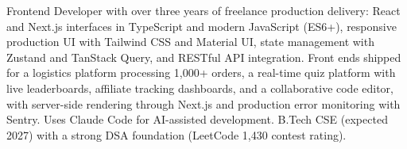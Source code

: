 \documentclass[11pt,a4paper,sans]{moderncv}
\begin{document}
\makecvtitle


\vspace{6pt}
\small{Frontend Developer with over three years of freelance production delivery: React and Next.js interfaces in TypeScript and modern JavaScript (ES6+), responsive production UI with Tailwind CSS and Material UI, state management with Zustand and TanStack Query, and RESTful API integration. Front ends shipped for a logistics platform processing 1,000+ orders, a real-time quiz platform with live leaderboards, affiliate tracking dashboards, and a collaborative code editor, with server-side rendering through Next.js and production error monitoring with Sentry. Uses Claude Code for AI-assisted development. B.Tech CSE (expected 2027) with a strong DSA foundation (LeetCode 1,430 contest rating).}

\end{document}
